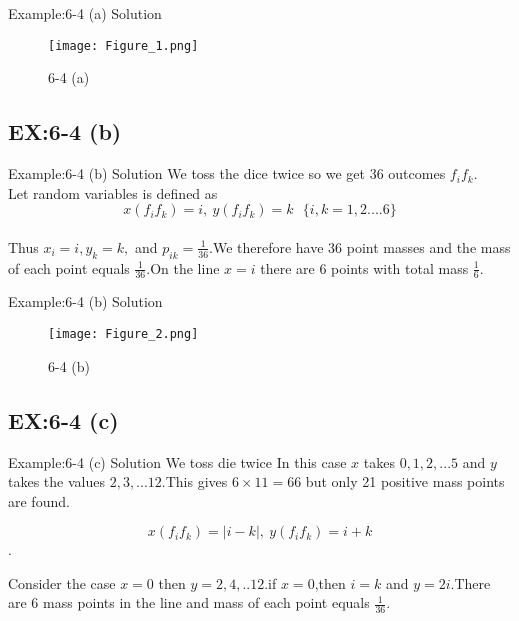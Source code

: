 \documentclass{beamer}
\begin{document}
  \begin{frame}{Example:6-4 (a) Solution}
  \begin{figure}
      \centering
      \texttt{[image: Figure\_1.png]}
      \caption{6-4 (a)}
      \label{fig:(a)}
  \end{figure}
      
  \end{frame}
  
  \subsection{EX:6-4 (b)}
  \begin{frame}{Example:6-4 (b) Solution}
      We toss the dice twice so we get 36 outcomes $f_i f_k$. \\
      
      Let random variables is defined as 
      $$ x(f_i f_k)=i,\:y(f_i f_k)=k\:\:\:\{i,k=1,2....6\} $$ \\
      
      Thus $x_i = i,y_k =k,$ and $p_{ik} = \frac{1}{36}$.We therefore have 36 point masses and the mass of each point equals $\frac{1}{36}$.On the line $x = i$ there are 6 points with total mass $\frac{1}{6}.$
  \end{frame}
  
  \begin{frame}{Example:6-4 (b) Solution}
      \begin{figure}
          \centering
          \texttt{[image: Figure\_2.png]}
          \caption{6-4 (b)}
          \label{fig:(b)}
      \end{figure}
  \end{frame}
  
  \subsection{EX:6-4 (c)}
  \begin{frame}{Example:6-4 (c) Solution}
  We toss die twice In this case $x$ takes $0,1,2,...5$ and
  $y$ takes the values $2,3,...12$.This gives $6 \times 11 = 66 $ but only 21 positive mass points are found.\\
  \begin{center}
  $$ x(f_i f_k)=|i-k| ,\: y(f_i f_k)=i+k$$.\\
  \end{center}
  Consider the case $x=0$  then $y= 2,4,..12$.if $x=0$,then
  $i=k$ and $y=2i$.There are 6 mass points in the line and mass
  of each point equals $\frac{1}{36}$.
  \end{frame}
  
\end{document}
